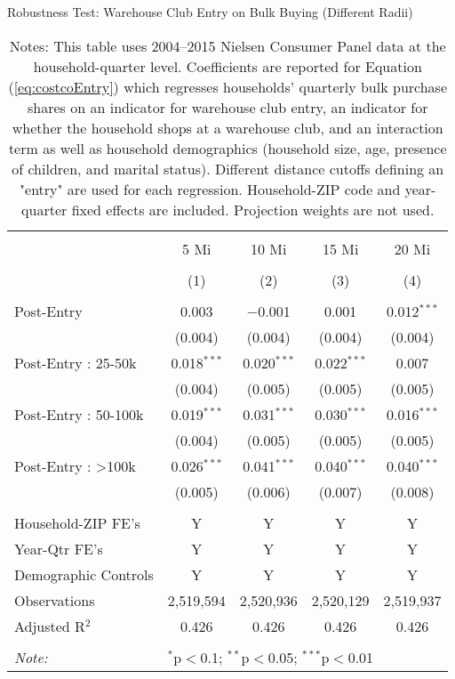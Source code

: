 \begin{table}[!htbp] \centering
  \caption{Robustness Test: Warehouse Club Entry on Bulk Buying (Different Radii)}
  \label{tab:appendixCostcoEntryDifferentRadii}
\begin{tabular}{@{\extracolsep{5pt}}lcccc}
\\[-1.8ex]\hline
\hline \\[-1.8ex]
 & 5 Mi & 10 Mi & 15 Mi & 20 Mi \\
\\[-1.8ex] & (1) & (2) & (3) & (4)\\
\hline \\[-1.8ex]
 Post-Entry & 0.003 & $-$0.001 & 0.001 & 0.012$^{***}$ \\
  & (0.004) & (0.004) & (0.004) & (0.004) \\
  Post-Entry : 25-50k & 0.018$^{***}$ & 0.020$^{***}$ & 0.022$^{***}$ & 0.007 \\
  & (0.004) & (0.005) & (0.005) & (0.005) \\
  Post-Entry : 50-100k & 0.019$^{***}$ & 0.031$^{***}$ & 0.030$^{***}$ & 0.016$^{***}$ \\
  & (0.004) & (0.005) & (0.005) & (0.005) \\
  Post-Entry : >100k & 0.026$^{***}$ & 0.041$^{***}$ & 0.040$^{***}$ & 0.040$^{***}$ \\
  & (0.005) & (0.006) & (0.007) & (0.008) \\
 \hline \\[-1.8ex]
Household-ZIP FE's & Y & Y & Y & Y \\
Year-Qtr FE's & Y & Y & Y & Y \\
Demographic Controls & Y & Y & Y & Y \\
Observations & 2,519,594 & 2,520,936 & 2,520,129 & 2,519,937 \\
Adjusted R$^{2}$ & 0.426 & 0.426 & 0.426 & 0.426 \\
\hline
\hline \\[-1.8ex]
\textit{Note:}  & \multicolumn{4}{l}{$^{*}$p$<$0.1; $^{**}$p$<$0.05; $^{***}$p$<$0.01} \\
\end{tabular}
\caption*{Notes: This table uses 2004--2015 Nielsen Consumer Panel data at the household-quarter level. Coefficients are reported for Equation (\ref{eq:costcoEntry}) which regresses households' quarterly bulk purchase shares on an indicator for warehouse club entry, an indicator for whether the household shops at a warehouse club, and an interaction term as well as household demographics (household size, age, presence of children, and marital status). Different distance cutoffs defining an "entry" are used for each regression. Household-ZIP code and year-quarter fixed effects are included. Projection weights are not used.}
\end{table}
